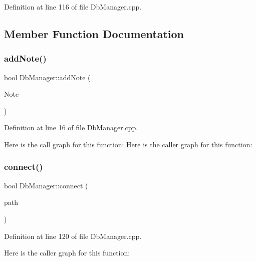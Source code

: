 Definition at line 116 of file Db\+Manager.\+cpp.



\subsection{Member Function Documentation}
\hypertarget{classDbManager_a0d97afdec08f212ec39100d26d8b4273}{}\label{classDbManager_a0d97afdec08f212ec39100d26d8b4273} 
\subsubsection{\texorpdfstring{add\+Note()}{addNote()}}
{\footnotesize\ttfamily bool Db\+Manager\+::add\+Note (\begin{DoxyParamCaption}\item[{\hyperlink{classMattyNote}{Matty\+Note} $\ast$}]{Note }\end{DoxyParamCaption})\hspace{0.3cm}{\ttfamily [static]}}



Definition at line 16 of file Db\+Manager.\+cpp.

Here is the call graph for this function\+:
Here is the caller graph for this function\+:
\hypertarget{classDbManager_abc90b3bf97dda268b4160a0662305898}{}\label{classDbManager_abc90b3bf97dda268b4160a0662305898} 
\subsubsection{\texorpdfstring{connect()}{connect()}}
{\footnotesize\ttfamily bool Db\+Manager\+::connect (\begin{DoxyParamCaption}\item[{const Q\+String \&}]{path }\end{DoxyParamCaption})\hspace{0.3cm}{\ttfamily [static]}}



Definition at line 120 of file Db\+Manager.\+cpp.

Here is the caller graph for this function\+:
\hypertarget{classDbManager_a164849758fd05445c7af2cc04fc3569f}{}\label{classDbManager_a164849758fd05445c7af2cc04fc3569f} 
